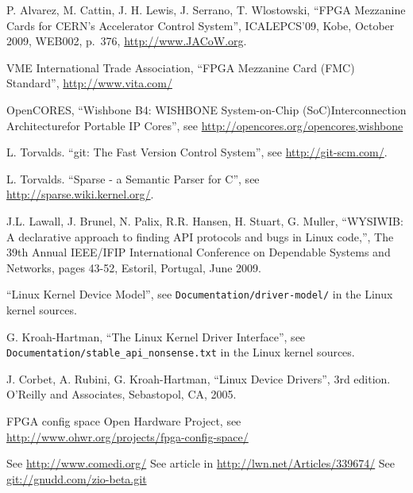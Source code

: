 \documentclass{JAC2003}
\begin{document}
\begin{thebibliography}{9}   %

P. Alvarez, M. Cattin, J. H. Lewis, J. Serrano, T. Wlostowski,
``FPGA Mezzanine Cards for CERN’s Accelerator Control System'',
ICALEPCS'09, Kobe, October 2009, WEB002, p.~376,
\url{http://www.JACoW.org}.

VME International Trade Association,
``FPGA Mezzanine Card (FMC) Standard'', \url{http://www.vita.com/}

OpenCORES,
``Wishbone B4: WISHBONE System-on-Chip (SoC)Interconnection
Architecturefor Portable IP Cores'',
see \url{http://opencores.org/opencores,wishbone}

L. Torvalds. ``git: The Fast Version Control System'',
see \url{http://git-scm.com/}.

L. Torvalds. ``Sparse - a Semantic Parser for C'',
see \url{http://sparse.wiki.kernel.org/}.

J.L. Lawall, J. Brunel, N. Palix, R.R. Hansen, H. Stuart, G. Muller,
``WYSIWIB: A declarative approach to finding API protocols and bugs in
Linux code,'', The 39th Annual IEEE/IFIP International Conference on
Dependable Systems and Networks, pages 43-52, Estoril, Portugal, June 2009.

``Linux Kernel Device Model'',
see \texttt{Documentation/driver-model/} in the Linux kernel sources.

G. Kroah-Hartman, ``The Linux Kernel Driver Interface'', see
\texttt{Documentation/stable\_api\_nonsense.txt} in the Linux kernel sources.

J. Corbet, A. Rubini, G. Kroah-Hartman, ``Linux Device Drivers'', 3rd
edition. O'Reilly and Associates, Sebastopol, CA, 2005.

 FPGA config space Open Hardware
Project, see
\url{http://www.ohwr.org/projects/fpga-config-space/}

 See \url{http://www.comedi.org/}
 See article in \url{http://lwn.net/Articles/339674/}
 See \url{git://gnudd.com/zio-beta.git}

\end{thebibliography}
\end{document}
